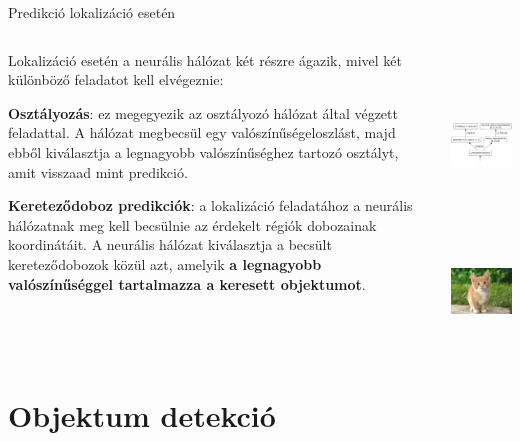\documentclass[english, aspectratio=169]{beamer}
\begin{document}
\begin{frame}{Predikció lokalizáció esetén}
\begin{columns}
\begin{column}{.6\textwidth}
Lokalizáció esetén a neurális hálózat két részre ágazik, mivel két különböző feladatot kell elvégeznie:\par\smallskip
\textbf{Osztályozás}: ez megegyezik az osztályozó hálózat által végzett feladattal. A hálózat megbecsül egy valószínűségeloszlást, majd ebből kiválasztja a legnagyobb valószínűséghez tartozó osztályt, amit visszaad mint predikció.\par\smallskip
\textbf{Kereteződoboz predikciók}: a lokalizáció feladatához a neurális hálózatnak meg kell becsülnie az érdekelt régiók dobozainak koordinátáit. A neurális hálózat kiválasztja a becsült kereteződobozok közül azt, amelyik \textbf{a legnagyobb valószínűséggel tartalmazza a keresett objektumot}. 
\end{column}
\begin{column}{.4\textwidth}
\begin{center}
\includegraphics[height=5cm, keepaspectratio]{graphs/od_2.png}\\
\vspace{-0.7cm}
\includegraphics[height=2.5cm, width=2.5cm, keepaspectratio]{images/od_1.png}
\end{center}
\end{column}
\end{columns}
\end{frame}

\section{Objektum detekció}
\end{document}
